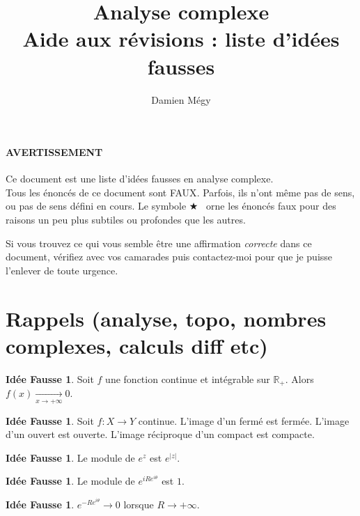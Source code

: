 \documentclass[11pt,a4paper]{article}
\title{Analyse complexe\\ Aide aux révisions : liste d'idées fausses}
\author{Damien Mégy}
\newcommand{\R}{\mathbb{R}}
\theoremstyle{definition}
\newtheorem{ideeFausse}[theoreme]{Idée Fausse}
\theoremstyle{plain}
\newcommand{\important}{$\bigstar$~}
\begin{document}
\maketitle
\tableofcontents

\bigskip
\paragraph{AVERTISSEMENT}
Ce document est une liste d'idées fausses en analyse complexe.\\

Tous les énoncés de ce document sont {\Large FAUX}. Parfois, ils n'ont même pas de sens, ou pas de sens défini en cours.
Le symbole \og\important\fg{} orne les énoncés faux pour des raisons un peu plus subtiles ou profondes que les autres.

\begin{mdframed}[linewidth=2pt]
Si vous trouvez ce qui vous semble être une affirmation \emph{correcte} dans ce document, vérifiez avec vos camarades puis contactez-moi pour que je puisse l'enlever  de toute urgence.
\end{mdframed}

\section{Rappels (analyse, topo, nombres complexes, calculs diff etc)}



\begin{ideeFausse}
Soit $f$ une fonction continue et intégrable sur $\R_+$.
Alors $f(x) \xrightarrow[x\to +\infty]{} 0$.
\end{ideeFausse}

\begin{ideeFausse}
Soit $f : X\to Y$ continue. L'image d'un fermé est fermée. L'image d'un ouvert est ouverte. L'image réciproque d'un compact est compacte.
\end{ideeFausse}

\begin{ideeFausse}
Le module de $e^z$ est $e^{|z|}$.
\end{ideeFausse}

\begin{ideeFausse}
Le module de $e^{iRe^{i\theta}}$ est $1$.
\end{ideeFausse}

\begin{ideeFausse}
$e^{-Re^{i\theta}}\to 0$ lorsque $R\to +\infty$.
\end{ideeFausse}
\end{document}
